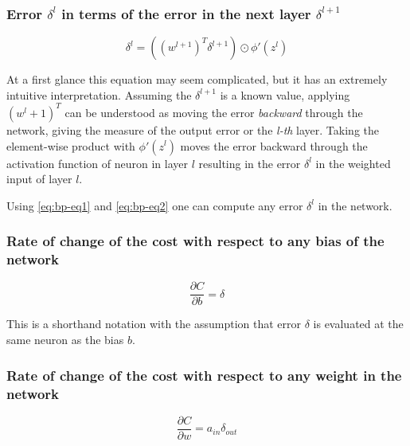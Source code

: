 \subsubsection*{Error $\delta^l$ in terms of the error in the next layer $\delta^{l+1}$}
\label{sub2:delta-l-to-delta-l+1}

\begin{equation}
    \delta^l = \left((w^{l+1})^T\delta^{l+1}\right) \odot \phi'(z^l)
    \tag{EQ2}
    \label{eq:bp-eq2}
\end{equation}

At a first glance this equation may seem complicated, but it has an extremely intuitive interpretation. Assuming the $\delta^{l+1}$ is a known value, applying $(w^l+1)^T$ can be understood as moving the error \emph{backward} through the network, giving the measure of the output error or the \emph{l-th} layer. Taking the element-wise product with $\phi'(z^l)$ moves the error backward through the activation function of neuron in layer $l$ resulting in the error $\delta^l$ in the weighted input of layer $l$.

Using \ref{eq:bp-eq1} and \ref{eq:bp-eq2} one can compute any error $\delta^l$ in the network.

\subsubsection*{Rate of change of the cost with respect to any bias of the network}
\label{sub2:rate-of-change-of-the-cost-with-respect-to-every-bias-of-the-network}

\begin{equation}
    \frac{\partial C}{\partial b} = \delta
    \tag{EQ3}
    \label{eq:bp-eq3}
\end{equation}

This is a shorthand notation with the assumption that error $\delta$ is evaluated at the same neuron as the bias $b$.

\subsubsection*{Rate of change of the cost with respect to any weight in the network}
\label{sub2:rate-of-change-of-the-cost-with-respect-to-any-weight-in-the-network}

\begin{equation}
    \frac{\partial C}{\partial w} = a_{in} \delta_{out}
    \tag{EQ4}
    \label{eq:bp-eq4}
\end{equation}

